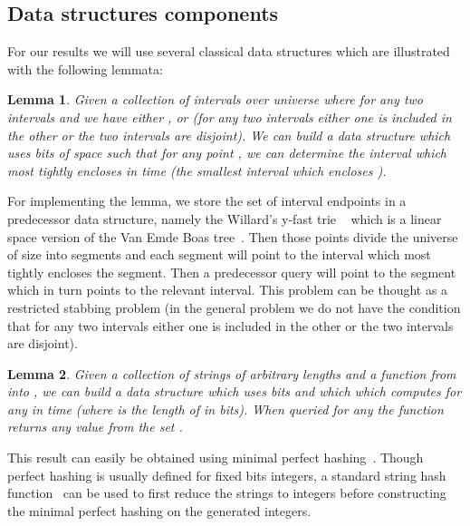 \documentclass{article}
\newcommand{\?}{\mskip1.5mu}
\newtheorem{lemma}{Lemma}
\begin{document}
\subsection{Data structures components}
For our results we will use several classical data structures which are illustrated with the following lemmata:
\begin{lemma}\cite{W83}
\label{lemma1}
Given a collection of  intervals over universe  where for any two intervals  and  we have either ,  or  (for any two intervals either one is included in the other or the two intervals are disjoint). We can build a data structure which uses  bits of space such that for any point , we can determine the interval which most tightly encloses  in  time (the smallest interval which encloses ). 
\end{lemma}
For implementing the lemma, we store the set of interval endpoints in a predecessor data structure, namely the Willard's y-fast trie ~\cite{W83} which is a linear space version of the Van Emde Boas tree~\cite{BKZ77}. Then those points divide the universe of size  into  segments and each segment will point to the interval which most tightly encloses the segment. Then a predecessor query will point to the segment which in turn points to the relevant interval. This problem can be thought as a restricted  stabbing problem (in the general problem we do not have the condition that for any two intervals either one is included in the other or the two intervals are disjoint).

\begin{lemma}
\label{lemma2}
Given a collection  of  strings of arbitrary lengths and a function  from  into , we can build a data structure which uses  bits and which which computes  for any  in time  (where  is the length of  in bits). When queried for any  the function returns any value from the set . 
\end{lemma}
This result can easily be obtained using minimal perfect hashing~\cite{FKS84,HT01}. Though perfect hashing is usually defined for fixed  bits integers, a standard string hash function~\cite{DGMP} can be used to first reduce the strings to integers before constructing the minimal perfect hashing on the generated integers. 
\end{document}

